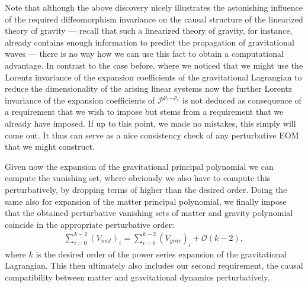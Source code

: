 Note that although the above discovery nicely illustrates the astonishing influence of the required diffeomorphism invariance on the causal structure of the linearized theory of gravity --- recall that such a linearized theory of gravity, for instance, already contains enough information to predict the propagation of gravitational waves --- there is no way how we can use this fact to obtain a computational advantage. In contrast to the case before, where we noticed that we might use the Lorentz invariance of the expansion coefficients of the gravitational Lagrangian to reduce the dimensionality of the arising linear systems now the further Lorentz invariance of the expansion coefficients of $\mathcal{P}^{p_1...p_r}$ is not deduced as consequence of a requirement that we wish to impose but stems from a  requirement that we already have imposed. If up to this point, we made no mistakes, this simply will come out. It thus can serve as a nice consistency check of any perturbative EOM that we might construct.

Given now the expansion of the gravitational principal polynomial we can compute the vanishing set, where obviously we also have to compute this perturbatively, by dropping terms of higher than the desired order. Doing the same also for expansion of the matter principal polynomial, we finally impose that the obtained perturbative vanishing sets of matter and gravity polynomial coincide in the appropriate perturbative order: 
\begin{align}
    \sum_{i=0}^{k-2} (V_{mat})_i = \sum _{i=0}^{k-2}(V_{grav})_i + \mathcal{O}(k-2),
\end{align}
where $k$ is the desired order of the power series expansion of the gravitational Lagrangian. This then ultimately also includes our second requirement, the causal compatibility between matter and gravitational dynamics perturbatively. 

